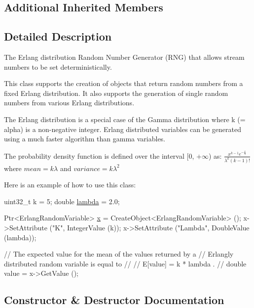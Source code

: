 \subsection*{Additional Inherited Members}


\subsection{Detailed Description}
The Erlang distribution Random Number Generator (R\+NG) that allows stream numbers to be set deterministically. 

This class supports the creation of objects that return random numbers from a fixed Erlang distribution. It also supports the generation of single random numbers from various Erlang distributions.

The Erlang distribution is a special case of the Gamma distribution where k (= alpha) is a non-\/negative integer. Erlang distributed variables can be generated using a much faster algorithm than gamma variables.

The probability density function is defined over the interval \mbox{[}0, $+\infty$) as\+: $ \frac{x^{k-1} e^{-\frac{x}{\lambda}}}{\lambda^k (k-1)!}$ where $ mean = k \lambda $ and $ variance = k \lambda^2$

Here is an example of how to use this class\+: 
\begin{DoxyCode}
uint32\_t k = 5;
\textcolor{keywordtype}{double} \hyperlink{loss__ITU1238_8m_aca36b09d6e71a60cfa3837d7e24c07ca}{lambda} = 2.0;

Ptr<ErlangRandomVariable> \hyperlink{lte__link__budget__x2__handover__measures_8m_a9336ebf25087d91c818ee6e9ec29f8c1}{x} = CreateObject<ErlangRandomVariable> ();
x->SetAttribute (\textcolor{stringliteral}{"K"}, IntegerValue (k));
x->SetAttribute (\textcolor{stringliteral}{"Lambda"}, DoubleValue (lambda));

\textcolor{comment}{// The expected value for the mean of the values returned by a}
\textcolor{comment}{// Erlangly distributed random variable is equal to }
\textcolor{comment}{//}
\textcolor{comment}{//     E[value]  =  k * lambda  .}
\textcolor{comment}{//}
\textcolor{keywordtype}{double} value = x->GetValue ();
\end{DoxyCode}
 

\subsection{Constructor \& Destructor Documentation}
